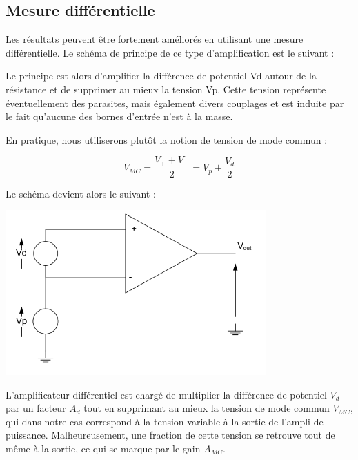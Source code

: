\documentclass{../template/labo}
\begin{document}


\subsection{Mesure différentielle}

Les résultats peuvent être fortement améliorés en utilisant une mesure différentielle.
Le schéma de principe de ce type d'amplification est le suivant :


Le principe est alors d'amplifier la différence de potentiel Vd autour de la résistance et de supprimer
au mieux la tension Vp. Cette tension représente éventuellement des parasites, mais également divers
couplages et est induite par le fait qu'aucune des bornes d'entrée n'est à la masse.

En pratique, nous utiliserons plutôt la notion de tension de mode commun :

$$V_{MC}=\frac{V_+ + V_-}{2} = V_p + \frac{V_d}{2}$$

Le schéma devient alors le suivant :

\begin{center}
\includegraphics[width=10cm]{sch4}
\end{center}

L'amplificateur différentiel est chargé de multiplier la différence de potentiel $V_d$ par un facteur $A_d$ tout
en supprimant au mieux la tension de mode commun $V_{MC}$, qui dans notre cas correspond à la tension
variable à la sortie de l'ampli de puissance.
Malheureusement, une fraction de cette tension se retrouve tout de même à la sortie, ce qui se marque
par le gain $A_{MC}$.
\end{document}

